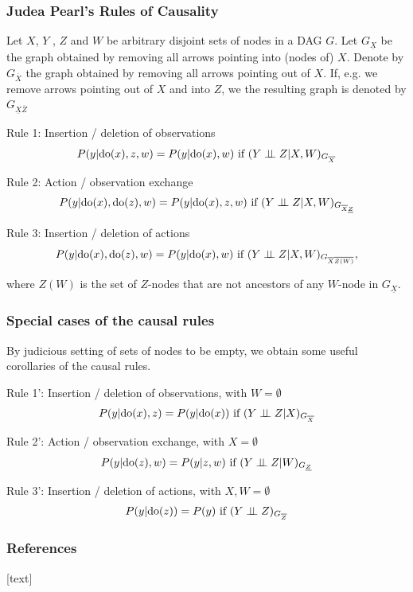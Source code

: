 \begin{frame}
\frametitle{Judea Pearl's Rules of Causality}

Let $X$, $Y$ , $Z$ and $W$ be arbitrary disjoint sets of nodes in a DAG $G$. Let $G_\underline{X}$ be the graph obtained by removing all arrows pointing into (nodes of) $X$. 
Denote by $G_{\overline{X}}$ the graph obtained by removing all arrows pointing out of $X$. If, e.g. we remove arrows pointing out of $X$ and into $Z$, we the resulting graph is denoted by $G_{\underline{X} \overline{Z}}$

Rule 1: Insertion / deletion of observations
\begin{equation*}
P(y | \mathrm{do}(x), z, w) = P(y | \mathrm{do}(x), w) \textrm{ if } (Y \perp\!\!\!\perp Z | X, W)_{G_{\overline{X}}}
\end{equation*}

Rule 2: Action / observation exchange
\begin{equation*}
P(y | \mathrm{do}(x), \mathrm{do}(z), w) = P(y | \mathrm{do}(x), z, w) \textrm{ if } (Y \perp\!\!\!\perp Z | X, W)_{G_{\overline{X} \underline{Z}}}
\end{equation*}

Rule 3: Insertion / deletion of actions
\begin{equation*}
P(y | \mathrm{do}(x), \mathrm{do}(z), w) = P(y | \mathrm{do}(x), w) \textrm{ if } (Y \perp\!\!\!\perp Z | X, W)_{G_{\overline{X} \overline{Z(W)}}},
\end{equation*}

where $Z(W)$ is the set of $Z$-nodes that are not ancestors of any $W$-node in $G_\underline{X}$.

\end{frame}

\begin{frame}
\frametitle{Special cases of the causal rules}

By judicious setting of sets of nodes to be empty, we obtain some useful corollaries of the causal rules.
\newline

Rule 1': Insertion / deletion of observations, with $W = \emptyset$
\begin{equation*}
    P(y | \mathrm{do}(x), z) = P(y | \mathrm{do}(x)) \textrm{ if } (Y \perp\!\!\!\perp Z | X)_{G_{\overline{X}}}
\end{equation*}

Rule 2': Action / observation exchange, with $X = \emptyset$
\begin{equation*}
P(y | \mathrm{do}(z), w) = P(y | z, w) \textrm{ if } (Y \perp\!\!\!\perp Z | W)_{G_{ \underline{Z}}}
\end{equation*}

Rule 3': Insertion / deletion of actions, with $X, W = \emptyset$
\begin{equation*}
P(y | \mathrm{do}(z)) = P(y) \textrm{ if } (Y \perp\!\!\!\perp Z )_{G_{\overline{Z}}}
\end{equation*}

\end{frame}

\begin{frame}[allowframebreaks]
    \frametitle{References}
    [text]
    
    
\end{frame}

